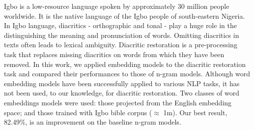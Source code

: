 Igbo is a low-resource language spoken by approximately 30 million people worldwide. It is the native language of the Igbo people of south-eastern Nigeria. In Igbo language, diacritics - orthographic and tonal - play a huge role in the distinguishing the meaning and pronunciation of words. Omitting diacritics in texts often leads to lexical ambiguity. Diacritic restoration is a pre-processing task that replaces missing diacritics on words from which they have been removed. In this work, we applied embedding models to the diacritic restoration task and compared their performances to those of n-gram models. Although word embedding models have been successfully applied to various NLP tasks, it has not been used, to our knowledge, for diacritic restoration. Two classes of word embeddings models were used: those projected from the English embedding space; and those trained with Igbo bible corpus ($\approx$ 1m). Our best result, 82.49\%, is an improvement on the baseline n-gram models.
